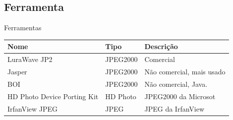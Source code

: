 \documentclass{beamer}
\begin{document}
  \subsection{Ferramenta}
  \begin{frame}{Ferramentas}
    \begin{tabular}{| l | l | l |}
      \hline
      \textbf{Nome} & \textbf{Tipo} & \textbf{Descrição} \\
      \hline
      LuraWave JP2 & JPEG2000 & Comercial \\
      \hline
      Jasper & JPEG2000 & Não comercial, mais usado \\
      \hline
      BOI & JPEG2000 & Não comercial, Java. \\
      \hline
      HD Photo Device Porting Kit & HD Photo & JPEG2000 da Microsot \\
      \hline
      IrfanView JPEG & JPEG & JPEG da IrfanView \\
      \hline
    \end{tabular}
  \end{frame}
\end{document}
